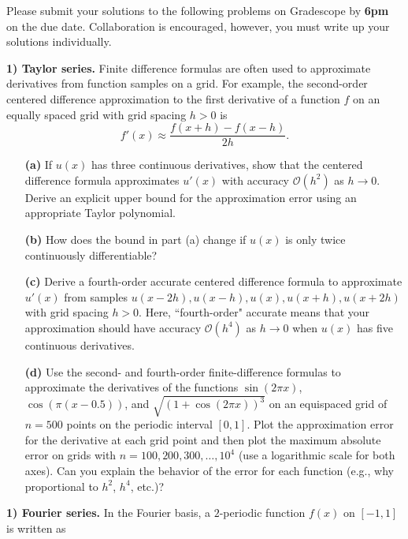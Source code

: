 \documentclass[12pt]{article}
\begin{document}
\noindent
Please submit your solutions to the following problems on Gradescope by \textbf{6pm} on the due date. Collaboration is encouraged, however, you must write up your solutions individually.

\bigskip

\noindent
\textbf{1) Taylor series.} Finite difference formulas are often used to approximate derivatives from function samples on a grid. For example, the second-order centered difference approximation to the first derivative of a function $f$ on an equally spaced grid with grid spacing $h>0$ is
$$
f'(x) \approx \frac{f(x+h)-f(x-h)}{2h}.
$$

\begin{itemize}
    \item[\textbf{(a)}] If $u(x)$ has three continuous derivatives, show that the centered difference formula approximates $u'(x)$ with accuracy $\mathcal{O}(h^2)$ as $h\rightarrow 0$. Derive an explicit upper bound for the approximation error using an appropriate Taylor polynomial. 

	\item[\textbf{(b)}] How does the bound in part (a) change if $u(x)$ is only twice continuously differentiable?
    
    \item[\textbf{(c)}] Derive a fourth-order accurate centered difference formula to approximate $u'(x)$ from samples $u(x-2h), u(x-h), u(x), u(x+h), u(x+2h)$ with grid spacing $h>0$. Here, ``fourth-order" accurate means that your approximation should have accuracy $\mathcal{O}(h^4)$ as $h\rightarrow 0$ when $u(x)$ has five continuous derivatives.

\item[\textbf{(d)}] Use the second- and fourth-order finite-difference formulas to approximate the derivatives of the functions $\sin(2\pi x)$, $\cos(\pi(x-0.5))$, and $\sqrt{(1+\cos(2\pi x))^3}$ on an equispaced grid of $n=500$ points on the periodic interval $[0,1]$. Plot the approximation error for the derivative at each grid point and then plot the maximum absolute error on grids with $n=100,200,300,\ldots,10^4$ (use a logarithmic scale for both axes). Can you explain the behavior of the error for each function (e.g., why proportional to $h^2$, $h^4$, etc.)?
\end{itemize}

\bigskip

\noindent
\textbf{1) Fourier series.} In the Fourier basis, a $2$-periodic function $f(x)$ on $[-1,1]$ is written as
\end{document}
